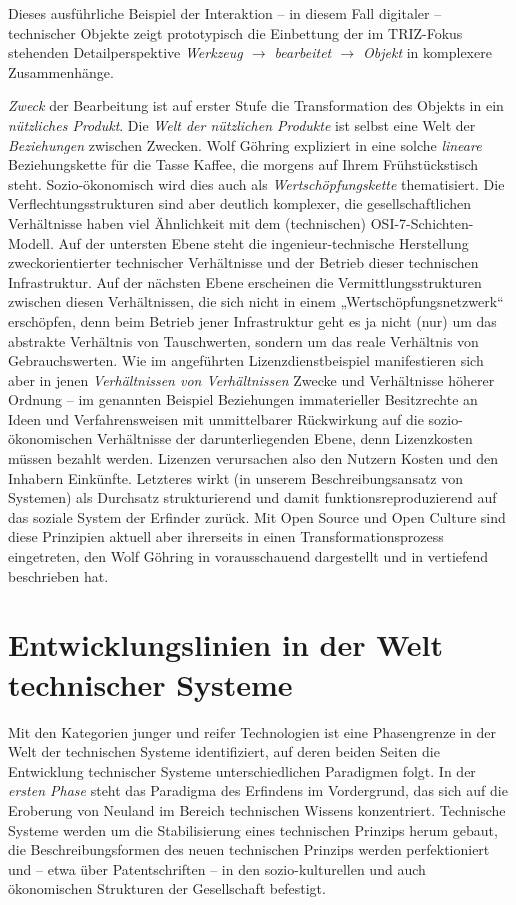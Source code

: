 \documentclass[11pt,a4paper]{article}
\begin{document}
Dieses ausführliche Beispiel der Interaktion -- in diesem Fall digitaler --
technischer Objekte zeigt prototypisch die Einbettung der im TRIZ-Fokus
stehenden Detailperspektive \emph{Werkzeug $\to$ bearbeitet $\to$ Objekt} in
komplexere Zusammenhänge.

\emph{Zweck} der Bearbeitung ist auf erster Stufe die Transformation des
Objekts in ein \emph{nützliches Produkt}. Die \emph{Welt der nützlichen
  Produkte} ist selbst eine Welt der \emph{Beziehungen} zwischen Zwecken.
Wolf Göhring expliziert in \cite{Goehring1999} eine solche \emph{lineare}
Beziehungskette für die Tasse Kaffee, die morgens auf Ihrem Frühstückstisch
steht. Sozio-ökonomisch wird dies auch als \emph{Wertschöpfungskette}
thematisiert. Die Verflechtungsstrukturen sind aber deutlich komplexer, die
gesellschaftlichen Verhältnisse haben viel Ähnlichkeit mit dem (technischen)
OSI-7-Schichten-Modell. Auf der untersten Ebene steht die ingenieur-technische
Herstellung zweckorientierter technischer Verhältnisse und der Betrieb dieser
technischen Infrastruktur.  Auf der nächsten Ebene erscheinen die
Vermittlungsstrukturen zwischen diesen Verhältnissen, die sich nicht in einem
„Wertschöpfungsnetzwerk“ erschöpfen, denn beim Betrieb jener Infrastruktur
geht es ja nicht (nur) um das abstrakte Verhältnis von Tauschwerten, sondern
um das reale Verhältnis von Gebrauchswerten.  Wie im angeführten
Lizenzdienstbeispiel manifestieren sich aber in jenen \emph{Verhältnissen von
  Verhältnissen} Zwecke und Verhältnisse höherer Ordnung -- im genannten
Beispiel Beziehungen immaterieller Besitzrechte an Ideen und Verfahrensweisen
mit unmittelbarer Rückwirkung auf die sozio-ökonomischen Verhältnisse der
darunterliegenden Ebene, denn Lizenzkosten müssen bezahlt werden.  Lizenzen
verursachen also den Nutzern Kosten und den Inhabern Einkünfte. Letzteres
wirkt (in unserem Beschreibungsansatz von Systemen) als Durchsatz
strukturierend und damit funktionsreproduzierend auf das soziale System der
Erfinder zurück. Mit Open Source und Open Culture sind diese Prinzipien
aktuell aber ihrerseits in einen Transformationsprozess eingetreten, den Wolf
Göhring in \cite{Goehring1999} vorausschauend dargestellt und in
\cite{Goehring2007} vertiefend beschrieben hat.

\section{Entwicklungslinien in der Welt technischer Systeme}

Mit den Kategorien junger und reifer Technologien ist eine Phasengrenze in der
Welt der technischen Systeme identifiziert, auf deren beiden Seiten die
Entwicklung technischer Systeme unterschiedlichen Paradigmen folgt.  In der
\emph{ersten Phase} steht das Paradigma des Erfindens im Vordergrund, das sich
auf die Eroberung von Neuland im Bereich technischen Wissens konzentriert.
Technische Systeme werden um die Stabilisierung eines technischen Prinzips
herum gebaut, die Beschreibungsformen des neuen technischen Prinzips werden
perfektioniert und -- etwa über Patentschriften -- in den sozio-kulturellen
und auch ökonomischen Strukturen der Gesellschaft befestigt.
\end{document}

